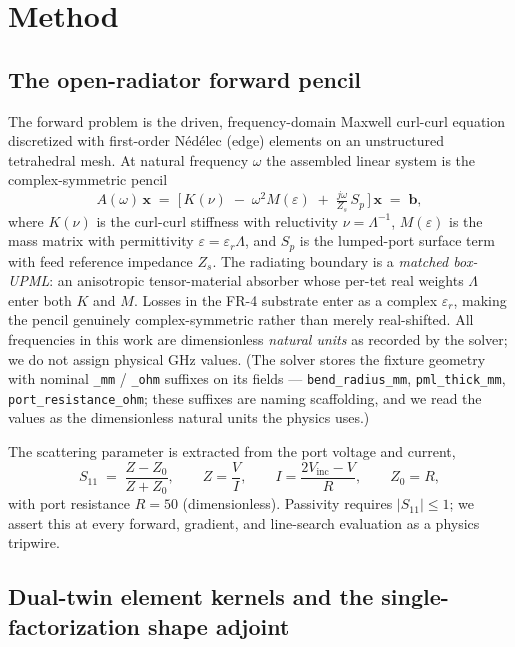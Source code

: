 \documentclass{anvil-paper}
\begin{document}
\section{Method}
\label{sec:method}

\subsection{The open-radiator forward pencil}
\label{sec:pencil}

The forward problem is the driven, frequency-domain Maxwell curl-curl equation
discretized with first-order N\'ed\'elec (edge) elements on an unstructured
tetrahedral mesh. At natural frequency $\omega$ the assembled linear system is
the complex-symmetric pencil
\begin{equation}
  A(\omega)\,\mathbf{x} \;=\; \Big[\,K(\nu)\;-\;\omega^2 M(\varepsilon)\;+\;\tfrac{j\omega}{Z_s}\,S_p\,\Big]\,\mathbf{x}
  \;=\; \mathbf{b},
  \label{eq:pencil}
\end{equation}
where $K(\nu)$ is the curl-curl stiffness with reluctivity $\nu=\Lambda^{-1}$,
$M(\varepsilon)$ is the mass matrix with permittivity $\varepsilon=\varepsilon_r\Lambda$,
and $S_p$ is the lumped-port surface term with feed reference impedance
$Z_s$. The radiating boundary is a \emph{matched box-UPML}: an anisotropic
tensor-material absorber whose per-tet real weights $\Lambda$ enter both $K$ and
$M$. Losses in the FR-4 substrate enter as a complex $\varepsilon_r$, making the
pencil genuinely complex-symmetric rather than merely real-shifted. All
frequencies in this work are dimensionless \emph{natural units} as recorded by
the solver; we do not assign physical GHz values. (The solver stores the fixture
geometry with nominal \texttt{\_mm} / \texttt{\_ohm} suffixes on its fields ---
\texttt{bend\_radius\_mm}, \texttt{pml\_thick\_mm}, \texttt{port\_resistance\_ohm};
these suffixes are naming scaffolding, and we read the values as the dimensionless
natural units the physics uses.)

The scattering parameter is extracted from the port voltage and current,
\begin{equation}
  S_{11} \;=\; \frac{Z-Z_0}{Z+Z_0}, \qquad Z=\frac{V}{I}, \qquad
  I=\frac{2V_{\text{inc}}-V}{R}, \qquad Z_0=R,
  \label{eq:s11}
\end{equation}
with port resistance $R=50$ (dimensionless). Passivity requires
$|S_{11}|\le 1$; we assert this at every forward, gradient, and line-search
evaluation as a physics tripwire.

\subsection{Dual-twin element kernels and the single-factorization shape adjoint}
\label{sec:adjoint}
\end{document}
